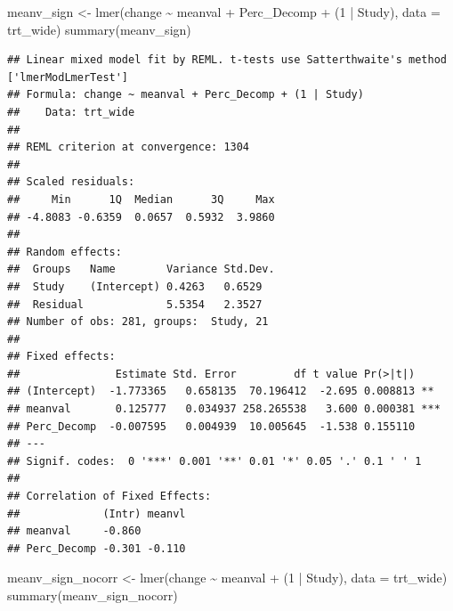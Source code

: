 \documentclass[
]{article}
\newenvironment{Shaded}{\begin{snugshade}}{\end{snugshade}}
\newcommand{\AttributeTok}[1]{\textcolor[rgb]{0.77,0.63,0.00}{#1}}
\newcommand{\DecValTok}[1]{\textcolor[rgb]{0.00,0.00,0.81}{#1}}
\newcommand{\FunctionTok}[1]{\textcolor[rgb]{0.00,0.00,0.00}{#1}}
\newcommand{\NormalTok}[1]{#1}
\newcommand{\OtherTok}[1]{\textcolor[rgb]{0.56,0.35,0.01}{#1}}
\newcommand{\SpecialCharTok}[1]{\textcolor[rgb]{0.00,0.00,0.00}{#1}}
\begin{document}
\begin{Shaded}
\begin{Highlighting}[]
\NormalTok{meanv\_sign }\OtherTok{\textless{}{-}} \FunctionTok{lmer}\NormalTok{(change }\SpecialCharTok{\textasciitilde{}}\NormalTok{ meanval }\SpecialCharTok{+}\NormalTok{ Perc\_Decomp }\SpecialCharTok{+}\NormalTok{ (}\DecValTok{1} \SpecialCharTok{|}\NormalTok{ Study), }\AttributeTok{data =}\NormalTok{ trt\_wide)}
\FunctionTok{summary}\NormalTok{(meanv\_sign)}
\end{Highlighting}
\end{Shaded}

\begin{verbatim}
## Linear mixed model fit by REML. t-tests use Satterthwaite's method ['lmerModLmerTest']
## Formula: change ~ meanval + Perc_Decomp + (1 | Study)
##    Data: trt_wide
## 
## REML criterion at convergence: 1304
## 
## Scaled residuals: 
##     Min      1Q  Median      3Q     Max 
## -4.8083 -0.6359  0.0657  0.5932  3.9860 
## 
## Random effects:
##  Groups   Name        Variance Std.Dev.
##  Study    (Intercept) 0.4263   0.6529  
##  Residual             5.5354   2.3527  
## Number of obs: 281, groups:  Study, 21
## 
## Fixed effects:
##               Estimate Std. Error         df t value Pr(>|t|)    
## (Intercept)  -1.773365   0.658135  70.196412  -2.695 0.008813 ** 
## meanval       0.125777   0.034937 258.265538   3.600 0.000381 ***
## Perc_Decomp  -0.007595   0.004939  10.005645  -1.538 0.155110    
## ---
## Signif. codes:  0 '***' 0.001 '**' 0.01 '*' 0.05 '.' 0.1 ' ' 1
## 
## Correlation of Fixed Effects:
##             (Intr) meanvl
## meanval     -0.860       
## Perc_Decomp -0.301 -0.110
\end{verbatim}

\begin{Shaded}
\begin{Highlighting}[]
\NormalTok{meanv\_sign\_nocorr }\OtherTok{\textless{}{-}} \FunctionTok{lmer}\NormalTok{(change }\SpecialCharTok{\textasciitilde{}}\NormalTok{ meanval }\SpecialCharTok{+}\NormalTok{ (}\DecValTok{1} \SpecialCharTok{|}\NormalTok{ Study), }\AttributeTok{data =}\NormalTok{ trt\_wide)}
\FunctionTok{summary}\NormalTok{(meanv\_sign\_nocorr)}
\end{Highlighting}
\end{Shaded}
\end{document}
